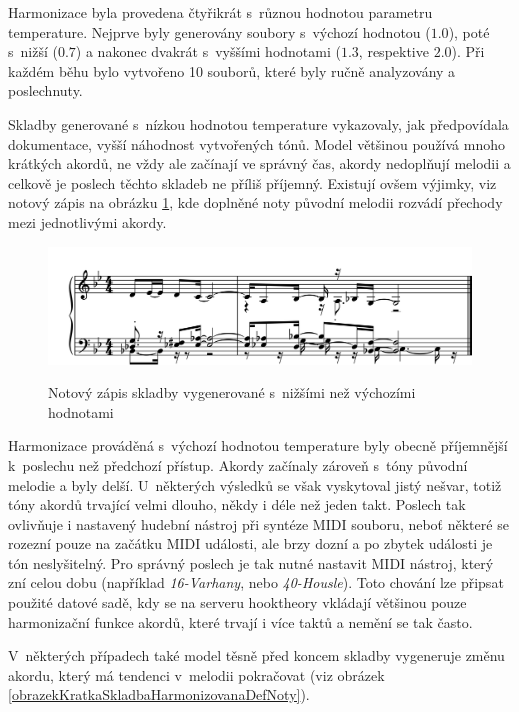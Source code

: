 Harmonizace byla provedena čtyřikrát 
s~různou hodnotou parametru temperature.
Nejprve byly generovány soubory s~výchozí hodnotou ($1.0$),
poté s~nižší ($0.7$) a nakonec dvakrát s~vyššími hodnotami ($1.3$, respektive $2.0$).
Při každém běhu bylo vytvořeno 10 souborů,
které byly ručně analyzovány a poslechnuty.
\par

Skladby generované s~nízkou hodnotou temperature vykazovaly,
jak předpovídala dokumentace, vyšší náhodnost vytvořených tónů.
Model většinou používá mnoho krátkých akordů, 
ne vždy ale začínají ve správný čas, akordy nedoplňují melodii 
a celkově je poslech těchto skladeb ne příliš příjemný.
Existují ovšem výjimky, viz notový zápis na obrázku 
\ref{obrazekKratkaSkladbaHarmonizovanaLowNoty},
kde doplněné noty původní melodii rozvádí přechody mezi jednotlivými akordy.

\begin{figure}[h]\centering
    \centering
    \includegraphics[width=0.8\linewidth]{obrazky/KratkaSkladbaHarmonizovanaLowNoty.png}\\[1pt]  
    \caption{Notový zápis skladby vygenerované s~nižšími než výchozími hodnotami}    
    \label{obrazekKratkaSkladbaHarmonizovanaLowNoty}
\end{figure}
\par

Harmonizace prováděná s~výchozí hodnotou temperature 
byly obecně příjemnější k~poslechu než předchozí přístup.
Akordy začínaly zároveň s~tóny původní melodie a byly delší.
U~některých výsledků se však vyskytoval jistý nešvar, 
totiž tóny akordů trvající velmi dlouho, někdy i déle než jeden takt.
Poslech tak ovlivňuje i nastavený hudební nástroj při syntéze MIDI souboru,
neboť některé se rozezní pouze na začátku MIDI události, ale brzy dozní
a po zbytek události je tón neslyšitelný.
Pro správný poslech je tak nutné nastavit MIDI nástroj, který zní celou dobu
(například \emph{16-Varhany}, nebo \emph{40-Housle}).
Toto chování lze připsat použité datové sadě,
kdy se na serveru hooktheory vkládají většinou pouze harmonizační funkce akordů,
které trvají i více taktů a nemění se tak často.
\par
V~některých případech také model těsně před koncem skladby vygeneruje změnu akordu,
který má tendenci v~melodii pokračovat (viz obrázek \ref{obrazekKratkaSkladbaHarmonizovanaDefNoty}).

